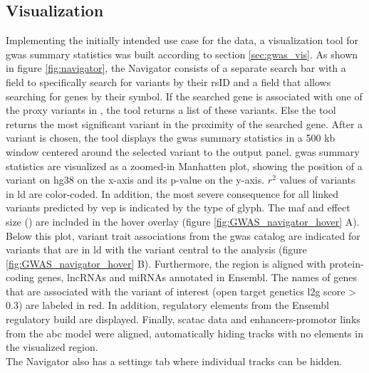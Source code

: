     \subsection{Visualization}
    \label{subsec:result_vis}
    Implementing the initially intended use case for the data, a visualization tool for \ac{gwas} summary statistics was built according to section \ref{sec:gwas_vis}. As shown in figure \ref{fig:navigator}, the  Navigator consists of a separate search bar with a field to specifically search for variants by their rsID and a field that allows searching for genes by their symbol. If the searched gene is associated with one of the proxy variants in \textcite{aragamDiscoverySystematicCharacterization2021}, the tool returns a list of these variants. Else the tool returns the most significant variant in the proximity of the searched gene. After a variant is chosen, the tool displays the \ac{gwas} summary statistics in a 500 kb window centered around the selected variant to the output panel. \ac{gwas} summary statistics are visualized as a zoomed-in Manhatten plot, showing the position of a variant on \ac{hg38} on the x-axis and its p-value on the y-axis. $r^2$ values of variants in \ac{ld} are color-coded. In addition, the most severe consequence for all linked variants predicted by \ac{vep} is indicated by the type of glyph. The \ac{maf} and effect size (\beta) are included in the hover overlay (figure \ref{fig:GWAS_navigator_hover} A). Below this plot, variant trait associations from the \ac{gwas} catalog are indicated for variants that are in \ac{ld} with the variant central to the analysis (figure \ref{fig:GWAS_navigator_hover} B). Furthermore, the region is aligned with protein-coding genes, \acp{lncRNA} and \acp{miRNA} annotated in Ensembl. The names of genes that are associated with the variant of interest (open target genetics \ac{l2g} score > 0.3) are labeled in red. In addition, regulatory elements from the Ensembl regulatory build are displayed. Finally, sc\ac{atac} data and enhancers-promotor links from the \ac{abc} model were aligned, automatically hiding tracks with no elements in the visualized region.\\
    The  Navigator also has a settings tab where individual tracks can be hidden.

